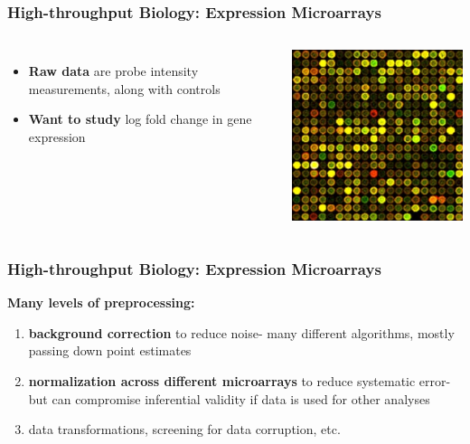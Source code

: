 \documentclass[10pt, compress]{beamer}
\begin{document}
\begin{frame}[fragile]
    \frametitle{High-throughput Biology: Expression Microarrays}
    
    \begin{columns}
            \begin{itemize}
                \item \textbf{Raw data} are probe intensity measurements, along with controls
                \item \textbf{Want to study} log fold change in gene expression
            \end{itemize}
        \vspace{.01cm}
            \includegraphics[height=\textheight]{assets/microarray.jpg}
    \end{columns}
    
\end{frame}

\begin{frame}[fragile]
    \frametitle{High-throughput Biology: Expression Microarrays}
    
    \textbf{Many levels of preprocessing:} 

    \begin{enumerate}
    \item \textbf{background correction} to reduce noise- many different algorithms, mostly passing down point estimates
    \vspace*{5mm}
    \item \textbf{normalization across different microarrays} to reduce systematic error- but can compromise inferential validity if data is used for other analyses
    \vspace*{5mm}
    \item data transformations, screening for data corruption, etc.
    \end{enumerate}
    
\end{frame}
\end{document}
